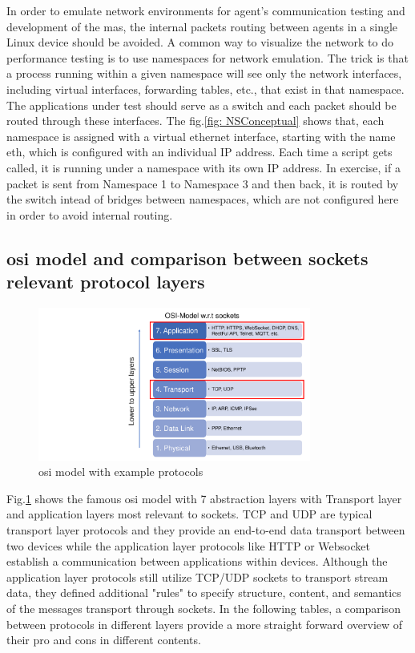 In order to emulate network environments for agent's communication testing 
and development of the \gls{mas}, the internal packets routing between 
agents in a single Linux device should be avoided. A common way to 
visualize the network to do performance testing is to use namespaces 
for network emulation. The trick is that a process running within a given 
namespace will see only the network interfaces, including virtual 
interfaces, forwarding tables, etc., that exist in that namespace. 
The applications under test should serve as a switch and each packet 
should be routed through these interfaces. The fig.\ref{fig: NSConceptual} 
shows that, each namespace is assigned with a virtual ethernet interface, 
starting with the name eth, which is configured with an individual IP 
address. Each time a script gets called, it is running under a namespace 
with its own IP address. In exercise, if a packet is sent from Namespace 1 
to Namespace 3 and then back, it is routed by the switch intead of bridges 
between namespaces, which are not configured here in order to avoid 
internal routing.

\subsection{\gls{osi} model and comparison between sockets relevant protocol layers}
\begin{figure}[htbp]
\includegraphics[width=0.8\textwidth]{figures/OSI.pdf}
\centering
\caption{\gls{osi} model with example protocols \label{fig: OSI}}
\end{figure}

Fig.\ref{fig: OSI} shows the famous \gls{osi} model with 7 abstraction layers with Transport layer and application layers most relevant to sockets. 
TCP and UDP are typical transport layer protocols and they provide an end-to-end data transport between two devices while the application layer protocols like HTTP or Websocket establish a communication between applications within devices. 
Although the application layer protocols still utilize TCP/UDP sockets to transport stream data, they defined additional "rules" to specify structure, content, and semantics of the messages transport through sockets. 
In the following tables, a comparison between protocols in different layers provide a more straight forward overview of their pro and cons in different contents.


